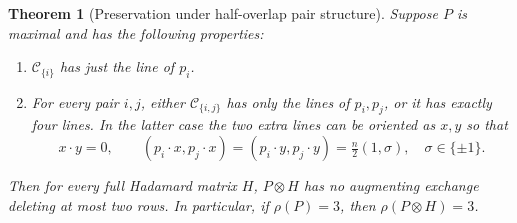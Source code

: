 \documentclass[11pt]{article}
\newtheorem{theorem}{Theorem}[section]
\begin{document}
\begin{theorem}[Preservation under half-overlap pair structure]
Suppose $P$ is maximal and has the following properties:
\begin{enumerate}
\item $\mathcal C_{\{i\}}$ has just the line of $p_i$.
\item For every pair $i,j$, either $\mathcal C_{\{i,j\}}$ has only the
lines of $p_i,p_j$, or it has exactly four lines. In the latter case
the two extra lines can be oriented as $x,y$ so that
\[
 x\cdot y=0,\qquad
 (p_i\cdot x,p_j\cdot x)=(p_i\cdot y,p_j\cdot y)
 =\tfrac n2(1,\sigma),\quad\sigma\in\{\pm1\}.
\]
\end{enumerate}
Then for every full Hadamard matrix $H$, $P\otimes H$ has no augmenting
exchange deleting at most two rows. In particular, if $\rho(P)=3$, then
$\rho(P\otimes H)=3$.
\end{theorem}
\end{document}
